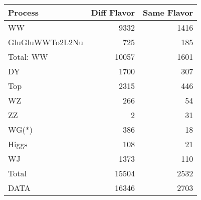 \begin{table}[ht]
	\centering
\begin{tabular}{lrr}

         Process &  Diff Flavor &  Same Flavor \\
		\hline
              WW &         9332 &         1416 \\
 GluGluWWTo2L2Nu &          725 &          185 \\
\hline
       Total: WW &        10057 &         1601 \\
              DY &         1700 &          307 \\
             Top &         2315 &          446 \\
              WZ &          266 &           54 \\
              ZZ &            2 &           31 \\
           WG(*) &          386 &           18 \\
           Higgs &          108 &           21 \\
              WJ &         1373 &          110 \\
\hline
           Total &        15504 &         2532 \\
            DATA &        16346 &         2703 \\


\end{tabular}

\end{table}